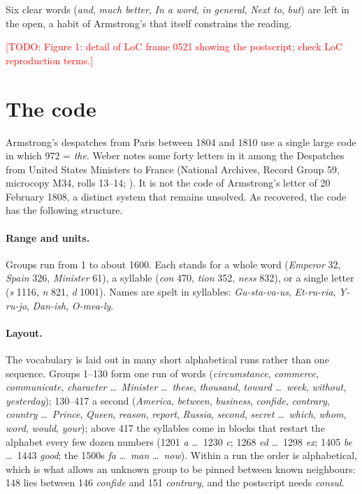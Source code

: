 \documentclass[11pt]{article}
\newcommand{\todo}[1]{\textcolor{red}{[TODO: #1]}}
\newcommand{\grp}[1]{\textsf{#1}}
\begin{document}
Six clear words (\emph{and}, \emph{much better}, \emph{In a word}, \emph{in general}, \emph{Next to}, \emph{but}) are left in the open, a habit of Armstrong's that itself constrains the reading.

\todo{Figure 1: detail of LoC frame 0521 showing the postscript; check LoC reproduction terms.}

\section{The code}\label{sec:code}

Armstrong's despatches from Paris between 1804 and 1810 use a single large code in which \grp{972} = \emph{the}. Weber notes some forty letters in it among the Despatches from United States Ministers to France (National Archives, Record Group 59, microcopy M34, rolls 13--14; \cite{Weber:1979}). It is not the code of Armstrong's letter of 20 February 1808, a distinct system that remains unsolved. As recovered, the code has the following structure.

\paragraph{Range and units.} Groups run from 1 to about 1600. Each stands for a whole word (\emph{Emperor} \grp{32}, \emph{Spain} \grp{326}, \emph{Minister} \grp{61}), a syllable (\emph{con} \grp{470}, \emph{tion} \grp{352}, \emph{ness} \grp{832}), or a single letter (\emph{s} \grp{1116}, \emph{n} \grp{821}, \emph{d} \grp{1001}). Names are spelt in syllables: \emph{Gu-sta-va-us}, \emph{Et-ru-ria}, \emph{Y-ru-jo}, \emph{Dan-ish}, \emph{O-mea-ly}.

\paragraph{Layout.} The vocabulary is laid out in many short alphabetical runs rather than one sequence. Groups 1--130 form one run of words (\emph{circumstance}, \emph{commerce}, \emph{communicate}, \emph{character} \ldots\ \emph{Minister} \ldots\ \emph{these}, \emph{thousand}, \emph{toward} \ldots\ \emph{week}, \emph{without}, \emph{yesterday}); 130--417 a second (\emph{America}, \emph{between}, \emph{business}, \emph{confide}, \emph{contrary}, \emph{country} \ldots\ \emph{Prince}, \emph{Queen}, \emph{reason}, \emph{report}, \emph{Russia}, \emph{second}, \emph{secret} \ldots\ \emph{which}, \emph{whom}, \emph{word}, \emph{would}, \emph{your}); above 417 the syllables come in blocks that restart the alphabet every few dozen numbers (\grp{1201} \emph{a} \ldots\ \grp{1230} \emph{c}; \grp{1268} \emph{ed} \ldots\ \grp{1298} \emph{ex}; \grp{1405} \emph{be} \ldots\ \grp{1443} \emph{good}; the 1500s \emph{fa} \ldots\ \emph{man} \ldots\ \emph{now}). Within a run the order is alphabetical, which is what allows an unknown group to be pinned between known neighbours: \grp{148} lies between \grp{146} \emph{confide} and \grp{151} \emph{contrary}, and the postscript needs \emph{consul}.
\end{document}
